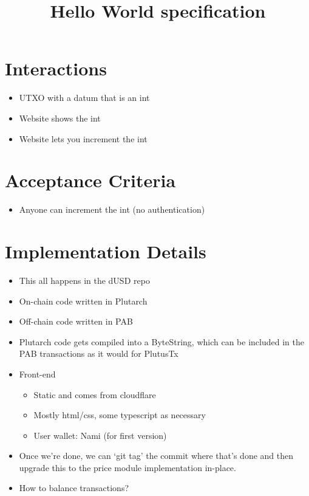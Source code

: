 \documentclass{article}
\title{Hello World specification}
\begin{document}
\maketitle

\section{Interactions}

\begin{itemize}
  \item UTXO with a datum that is an int
  \item Website shows the int
  \item Website lets you increment the int
\end{itemize}

\section{Acceptance Criteria}

\begin{itemize}
  \item Anyone can increment the int (no authentication)
\end{itemize}

\section{Implementation Details}

\begin{itemize}
  \item This all happens in the dUSD repo
  \item On-chain code written in Plutarch
  \item Off-chain code written in PAB
  \item Plutarch code gets compiled into a ByteString, which can be included in
    the PAB transactions as it would for PlutusTx
  \item Front-end
  \begin{itemize}
    \item Static and comes from cloudflare
    \item Mostly html/css, some typescript as necessary
    \item User wallet: Nami (for first version)
  \end{itemize}
  \item Once we’re done, we can `git tag' the commit where that’s done and then
    upgrade this to the price module implementation in-place.
  \item How to balance transactions? 
\end{itemize}
\end{document}
